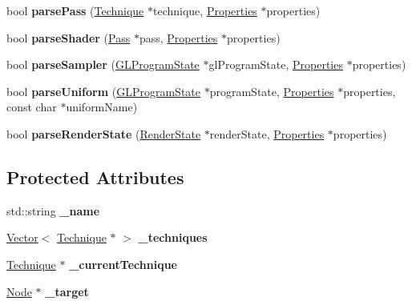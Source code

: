 \begin{DoxyCompactItemize}
bool {\bfseries parse\+Pass} (\hyperlink{classTechnique}{Technique} $\ast$technique, \hyperlink{classProperties}{Properties} $\ast$properties)
\item 
\mbox{\label{classMaterial_ad880cfddfc8aba2c07ce8f28962d4818}} 
bool {\bfseries parse\+Shader} (\hyperlink{classPass}{Pass} $\ast$pass, \hyperlink{classProperties}{Properties} $\ast$properties)
\item 
\mbox{\label{classMaterial_ad6e8d499129cc4e8ebfa5ab9554caacd}} 
bool {\bfseries parse\+Sampler} (\hyperlink{classGLProgramState}{G\+L\+Program\+State} $\ast$gl\+Program\+State, \hyperlink{classProperties}{Properties} $\ast$properties)
\item 
\mbox{\label{classMaterial_a247f9daeec0f17debad6b1f3038e9968}} 
bool {\bfseries parse\+Uniform} (\hyperlink{classGLProgramState}{G\+L\+Program\+State} $\ast$program\+State, \hyperlink{classProperties}{Properties} $\ast$properties, const char $\ast$uniform\+Name)
\item 
\mbox{\label{classMaterial_a47b833e30a164c440f1b9f9e85487f52}} 
bool {\bfseries parse\+Render\+State} (\hyperlink{classRenderState}{Render\+State} $\ast$render\+State, \hyperlink{classProperties}{Properties} $\ast$properties)
\end{DoxyCompactItemize}
\subsection*{Protected Attributes}
\begin{DoxyCompactItemize}
\item 
\mbox{\label{classMaterial_a98a77badbaeb5f34b87d23e406fafd73}} 
std\+::string {\bfseries \+\_\+name}
\item 
\mbox{\label{classMaterial_a391bc69f62a77b9849f868dba7c3350b}} 
\hyperlink{classVector}{Vector}$<$ \hyperlink{classTechnique}{Technique} $\ast$ $>$ {\bfseries \+\_\+techniques}
\item 
\mbox{\label{classMaterial_afd7e62cb2e07b0d295c73a5126e820c0}} 
\hyperlink{classTechnique}{Technique} $\ast$ {\bfseries \+\_\+current\+Technique}
\item 
\mbox{\label{classMaterial_ade6937b0a66583121eb61f49f649f0be}} 
\hyperlink{classNode}{Node} $\ast$ {\bfseries \+\_\+target}
\end{DoxyCompactItemize}
